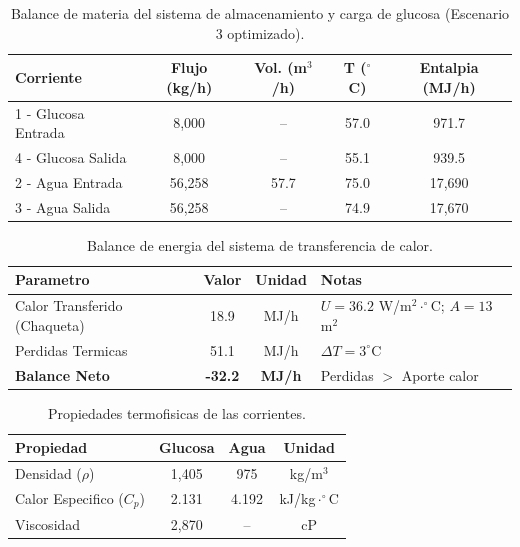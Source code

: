 
\begin{table}[H]
\centering
\caption{Balance de materia del sistema de almacenamiento y carga de glucosa (Escenario 3 optimizado).}
\label{tab:balance_materia}
\footnotesize
\begin{tabular}{@{}lcccc@{}}
\toprule
\textbf{Corriente} & \textbf{Flujo (kg/h)} & \textbf{Vol. (m$^3$/h)} & \textbf{T ($^\circ$C)} & \textbf{Entalpia (MJ/h)} \\
\midrule
1 - Glucosa Entrada & 8,000 & -- & 57.0 & 971.7 \\
4 - Glucosa Salida & 8,000 & -- & 55.1 & 939.5 \\
\midrule
2 - Agua Entrada & 56,258 & 57.7 & 75.0 & 17,690 \\
3 - Agua Salida & 56,258 & -- & 74.9 & 17,670 \\
\bottomrule
\end{tabular}
\end{table}

\begin{table}[H]
\centering
\caption{Balance de energia del sistema de transferencia de calor.}
\label{tab:balance_energia}
\footnotesize
\begin{tabular}{@{}lccl@{}}
\toprule
\textbf{Parametro} & \textbf{Valor} & \textbf{Unidad} & \textbf{Notas} \\
\midrule
Calor Transferido (Chaqueta) & 18.9 & MJ/h & $U = 36.2$ W/m$^2\cdot^\circ$C; $A = 13$ m$^2$ \\
Perdidas Termicas & 51.1 & MJ/h & $\Delta T = 3^\circ$C \\
\midrule
\textbf{Balance Neto} & \textbf{-32.2} & \textbf{MJ/h} & Perdidas $>$ Aporte calor \\
\bottomrule
\end{tabular}
\end{table}

\begin{table}[H]
\centering
\caption{Propiedades termofisicas de las corrientes.}
\label{tab:propiedades_balance}
\footnotesize
\begin{tabular}{@{}lccc@{}}
\toprule
\textbf{Propiedad} & \textbf{Glucosa} & \textbf{Agua} & \textbf{Unidad} \\
\midrule
Densidad ($\rho$) & 1,405 & 975 & kg/m$^3$ \\
Calor Especifico ($C_p$) & 2.131 & 4.192 & kJ/kg$\cdot^\circ$C \\
Viscosidad & 2,870 & -- & cP \\
\bottomrule
\end{tabular}
\end{table}
